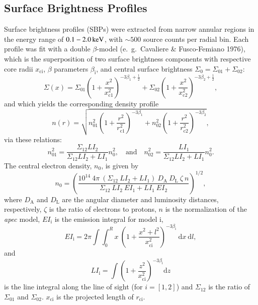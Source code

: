 \documentclass[structabstract]{aa}
\begin{document}
\subsection{Surface Brightness Prof\hspace{0mm}iles} \label{sbps} Surface
brightness profiles (SBPs) were extracted from narrow annular regions
in the energy range of $\unit[0.1-2.0]{keV}$, with $\sim500$ source
counts per radial bin. Each profile was fit with a double
$\beta$-model (e.\ g.\ Cavaliere \& Fusco-Femiano 1976), which is the
superposition of two surface brightness components with respective
core radii $x_{\text{ci}}$, $\beta$ parameters $\beta_{\text{i}}$, and
central surface brightness $\Sigma_{0}= \Sigma_{01}+ \Sigma_{02}$:
\begin{equation}\label{eqndoublesigma}
\Sigma(x) = \Sigma_{01}\left(1+\frac{x^2}{x_{\text{c1}}^2}\right)^{-3\beta_1+\frac{1}{2}}+\Sigma_{02}\left(1+\frac{x^2}{x_{\text{c2}}^2}\right)^{-3\beta_2+\frac{1}{2}},
\end{equation}
and which yields the corresponding density profile
\begin{equation} \label{eqndoublebeta}
  n(r) = \sqrt{n^2_{01} \left( 1+\frac{r^2}{r_{\text{c1}}^2}\right)^{-3\beta_{1}} + n^2_{02} \left( 1+\frac{r^2}{r_{\text{c2}}^2}\right)^{-3\beta_{2}}},
\end{equation}
via these relations:
\begin{equation}
n^2_{01}=\frac{\Sigma_{12}LI_2}{\Sigma_{12}LI_2+LI_1}n^2_0,\quad\text{and}\quad n^2_{02}=\frac{LI_1}{\Sigma_{12}LI_2+LI_1}n^2_0.
\end{equation}
The central electron density, $n_0$, is given by
\begin{equation}
n_0=\left(\frac{10^{14}~4\pi~(\Sigma_{12}~LI_2 + LI_1)~D_{\text{A}}~D_{\text{L}}~\zeta~n}{\Sigma_{12}~LI_2~EI_1 + LI_1~EI_2} \right)^{1/2},
\end{equation}
where $D_{\text{A}}$ and $D_{\text{L}}$ are the angular diameter and luminosity distances, respectively, $\zeta$ is the ratio of electrons to protons, $n$ is the normalization of the \emph{apec} model, $EI_{\text{i}}$ is the emission integral for model i,
\begin{equation}
EI_{\text{i}}=2\pi \int \int^{R}_{0} x~\left(1+ \frac{x^2+l^2}{x^2_{\text{ci}}}  \right)^{-3\beta_{\text{i}}}~\text{d} x~\text{d} l,
\end{equation}
and
\begin{equation}
 LI_{\text{i}}=\int \left(1+\frac{z^2}{x_{\text{ci}}^2}\right)^{-3\beta_{\text{i}}}\text{d}z
\end{equation}
is the line integral along the line of sight (for $i=[1,2]$) and
$\Sigma_{12}$ is the ratio of $\Sigma_{01}$ and
$\Sigma_{02}$. $x_{\text{ci}}$ is the projected length of
$r_{\text{ci}}$.
\end{document}
